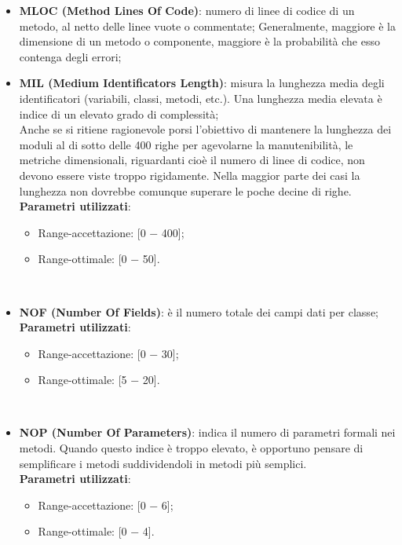 \begin{itemize}
\begin{itemize}
		\item \textbf{MLOC (Method Lines Of Code)}: numero di linee di codice di un metodo, al netto delle linee vuote o commentate; Generalmente, maggiore è la dimensione di un metodo o componente, maggiore è la probabilità che esso contenga degli errori;
		
		\item \textbf{MIL (Medium Identificators Length)}: misura la lunghezza media degli identificatori (variabili, classi, metodi, etc.). Una lunghezza media elevata è indice di un elevato grado di complessità;\\
	
		Anche se si ritiene ragionevole porsi l'obiettivo di mantenere la lunghezza dei moduli al di sotto delle 400 righe per agevolarne la manutenibilità, le metriche dimensionali,  riguardanti cioè il numero di linee di codice, non devono essere viste troppo rigidamente. Nella maggior parte dei casi la lunghezza non dovrebbe comunque superare le poche decine di righe. \\
		
		\textbf{Parametri utilizzati}:
		\begin{itemize}
			\item Range-accettazione: [0 − 400];
			\item Range-ottimale: [0 − 50].
		\end{itemize} \\ \bigskip
		
		 \item \textbf{NOF (Number Of Fields)}: è il numero totale dei campi dati per classe; \\
		
		\textbf{Parametri utilizzati}:
		\begin{itemize}
			\item Range-accettazione: [0 − 30];
			\item Range-ottimale: [5 − 20].
		\end{itemize} \\ \bigskip
		
		\item \textbf{NOP (Number Of Parameters)}: indica il numero di parametri formali nei metodi. Quando questo indice è troppo elevato, è opportuno pensare di semplificare i metodi suddividendoli in metodi più semplici. \\
		
		\textbf{Parametri utilizzati}:
		\begin{itemize}
			\item Range-accettazione: [0 − 6];
			\item Range-ottimale: [0 − 4].
		\end{itemize} \\ \bigskip


\end{itemize}
\end{itemize}
